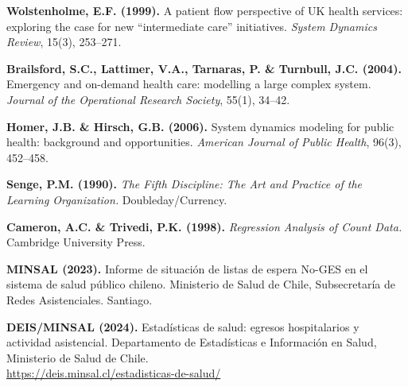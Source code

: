 \documentclass[12pt,a4paper]{article}
\begin{document}
\begin{enumerate}[leftmargin=1.5cm,label=\textbf{[\arabic*]}]
  \item \label{ref:wolstenholme} \textbf{Wolstenholme, E.F. (1999).} A patient flow perspective of UK health services:
        exploring the case for new ``intermediate care'' initiatives.
        \textit{System Dynamics Review}, 15(3), 253--271.

  \item \label{ref:brailsford} \textbf{Brailsford, S.C., Lattimer, V.A., Tarnaras, P. \& Turnbull, J.C. (2004).}
        Emergency and on-demand health care: modelling a large complex system.
        \textit{Journal of the Operational Research Society}, 55(1), 34--42.

  \item \label{ref:homer} \textbf{Homer, J.B. \& Hirsch, G.B. (2006).} System dynamics modeling for public
        health: background and opportunities.
        \textit{American Journal of Public Health}, 96(3), 452--458.

  \item \label{ref:senge} \textbf{Senge, P.M. (1990).} \textit{The Fifth Discipline: The Art and Practice of
          the Learning Organization.} Doubleday/Currency.

  \item \label{ref:cameron} \textbf{Cameron, A.C. \& Trivedi, P.K. (1998).}
        \textit{Regression Analysis of Count Data.} Cambridge University Press.

  \item \label{ref:minsal} \textbf{MINSAL (2023).} Informe de situación de listas de espera No-GES en el
        sistema de salud público chileno. Ministerio de Salud de Chile, Subsecretaría
        de Redes Asistenciales. Santiago.

  \item \label{ref:deis} \textbf{DEIS/MINSAL (2024).} Estadísticas de salud: egresos hospitalarios y
        actividad asistencial. Departamento de Estadísticas e Información en Salud,
        Ministerio de Salud de Chile.\\
        \url{https://deis.minsal.cl/estadisticas-de-salud/}

\end{enumerate}
\end{document}
